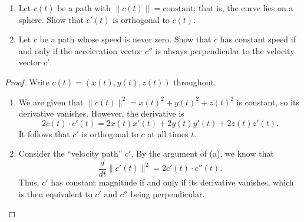 \documentclass[openany]{book}
\begin{document}
\begin{prob}[8]
    \begin{enumerate}
        \item[(a)]  Let \( c(t) \) be a path with \( \|c(t)\| = \text{constant} \); that is, the curve lies on a sphere. Show that \( c'(t) \) is orthogonal to \( c(t) \).
        \item[(b)] Let \( c \) be a path whose speed is never zero. Show that \( c \) has constant speed if and only if the acceleration vector \( c'' \) is always perpendicular to the velocity vector \( c' \).
    \end{enumerate}
\end{prob}
\begin{proof}
    Write $c(t)=(x(t),y(t),z(t))$ throughout.
    \begin{enumerate}
        \item[(a)] We are given that $\lVert c(t)\rVert^2=x(t)^2+y(t)^2+z(t)^2$ is constant, so its derivative vanishes. However, the derivative is
        \[2c(t)\cdot c'(t)=2x(t)x'(t)+2y(t)y'(t)+2z(t)z'(t).\]
        It follows that $c'$ is orthogonal to $c$ at all times $t$.
        \item[(b)] Consider the ``velocity path'' $c'$. By the argument of (a), we know that
        \[\frac d{dt}\lVert c'(t)\rVert^2=2c'(t)\cdot c''(t).\]
        Thus, $c'$ has constant magnitude if and only if its derivative vanishes, which is then equivalent to $c'$ and $c''$ being perpendicular.
        \qedhere
    \end{enumerate}
\end{proof}
\end{document}
